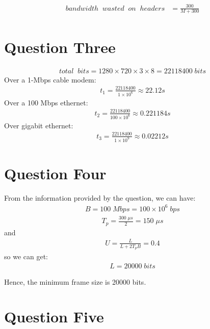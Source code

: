 \documentclass[paper=a4, fontsize=11pt]{scrartcl} %
\numberwithin{equation}{section} %
\numberwithin{figure}{section} %
\numberwithin{table}{section} %
\begin{document}
\begin{align}
	\begin{split}
		bandwidth\;\;wasted\;\;on\;\;headers&=\frac{300}{M+300}
	\end{split}
\end{align}

\section{Question Three}
\begin{align}
	total\;\;bits=1280\times720\times3\times8=22118400\;bits
\end{align}
Over a 1-Mbps cable modem:
\begin{align}
	t_1 = \frac{22118400}{1\times 10^6}\approx22.12 s
\end{align}
Over a 100 Mbps ethernet:
\begin{align}
	t_2 = \frac{22118400}{100\times10^6}\approx0.221184s
\end{align}
Over gigabit ethernet:
\begin{align}
	t_3 = \frac{22118400}{1\times10^9}\approx0.02212s
\end{align}

\section{Question Four}
From the information provided by the question, we can have:
\begin{align}
	B=100\;Mbps = 100\times10^6\; bps
\end{align}
\begin{align}
	T_p = \frac{300\;\mu s}{2}=150\;\mu s
\end{align}
and
\begin{align}
	U = \frac{L}{L+2T_pB}=0.4
\end{align}
so we can get:
\begin{align}
	L = 20000\;bits
\end{align}

Hence, the minimum frame size is 20000 bits.


\section{Question Five}
\end{document}
